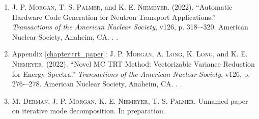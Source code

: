 \begin{enumerate}
    \item \textsc{J. P. Morgan}, \textsc{T. S. Palmer}, and \textsc{K. E. Niemeyer}. (2022). “Automatic Hardware Code Generation for Neutron Transport Applications.” \emph{Transactions of the American Nuclear Society}, v126, p. 318–-320. American Nuclear Society, Anaheim, CA. . .

    \item Appendix \ref{chapter:trt_paper}: \textsc{J. P. Morgan}, \textsc{A. Long}, \textsc{K. Long}, and \textsc{K. E. Niemeyer}. (2022). “Novel MC TRT Method: Vectorizable Variance Reduction for Energy Spectra.” \emph{Transactions of the American Nuclear Society}, v126, p. 276-–278. American Nuclear Society, Anaheim, CA. . .

    \item \textsc{M. Derman}, \textsc{J. P. Morgan}, \textsc{K. E. Niemeyer}, \textsc{T. S. Palmer}. Unnamed paper on iterative mode decomposition. In preparation.
\end{enumerate}